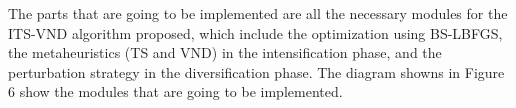 \documentclass{article}
\begin{document}

The parts that are going to be implemented are all the necessary modules for the ITS-VND algorithm proposed, which include the optimization using BS-LBFGS, the metaheuristics (TS and VND) in the intensification phase, and the perturbation strategy in the diversification phase. The diagram showns in Figure 6 show the modules that are going to be implemented.\\



\end{document}
